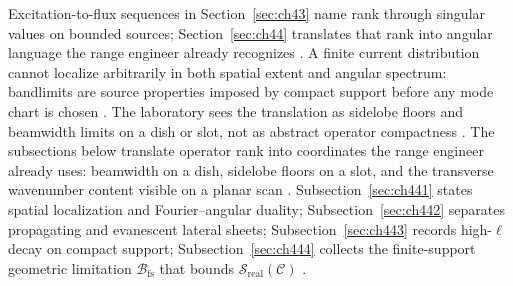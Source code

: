 Excitation-to-flux sequences in Section~\ref{sec:ch43} name rank through singular values on bounded sources; Section~\ref{sec:ch44} translates that rank into angular language the range engineer already recognizes \cite{jackson1999}. A finite current distribution cannot localize arbitrarily in both spatial extent and angular spectrum: bandlimits are source properties imposed by compact support before any mode chart is chosen \cite{landau1962}. The laboratory sees the translation as sidelobe floors and beamwidth limits on a dish or slot, not as abstract operator compactness \cite{stratton1941}.
The subsections below translate operator rank into coordinates the range engineer already uses: beamwidth on a dish, sidelobe floors on a slot, and the transverse wavenumber content visible on a planar scan \cite{jackson1999}. Subsection~\ref{sec:ch441} states spatial localization and Fourier--angular duality; Subsection~\ref{sec:ch442} separates propagating and evanescent lateral sheets; Subsection~\ref{sec:ch443} records high-$\ell$ decay on compact support; Subsection~\ref{sec:ch444} collects the finite-support geometric limitation $\mathcal{B}_{\mathrm{fs}}$ that bounds $\mathcal{S}_{\mathrm{real}}(\mathcal{C})$ \cite{stratton1941}.
